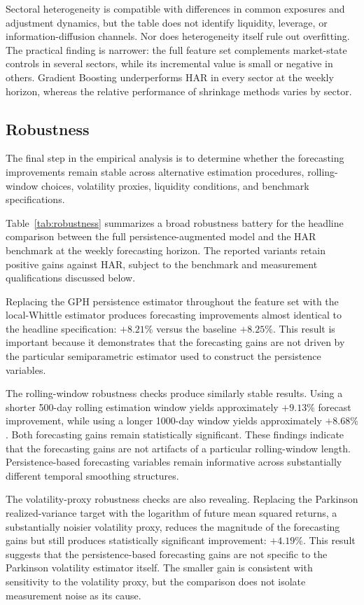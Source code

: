 \documentclass[jrfm,article,submit,moreauthors,pdftex]{Definitions/mdpi}
\begin{document}
Sectoral heterogeneity is compatible with differences in common exposures
and adjustment dynamics, but the table does not identify liquidity,
leverage, or information-diffusion channels. Nor does heterogeneity itself
rule out overfitting. The practical finding is narrower: the full feature
set complements market-state controls in several sectors, while its
incremental value is small or negative in others. Gradient Boosting
underperforms HAR in every sector at the weekly horizon, whereas the
relative performance of shrinkage methods varies by sector.

\subsection{Robustness}

The final step in the empirical analysis is to determine whether the
forecasting improvements remain stable across alternative estimation
procedures, rolling-window choices, volatility proxies, liquidity
conditions, and benchmark specifications.

Table~\ref{tab:robustness} summarizes a broad robustness battery for the
headline comparison between the full persistence-augmented model and the HAR benchmark
at the weekly forecasting horizon. The reported variants retain positive gains against HAR, subject to the
benchmark and measurement qualifications discussed below.

Replacing the GPH persistence estimator throughout the feature set with
the local-Whittle estimator produces forecasting improvements almost
identical to the headline specification: $+8.21\%$ versus the baseline
$+8.25\%$. This result is important because it demonstrates that the
forecasting gains are not driven by the particular semiparametric estimator
used to construct the persistence variables.

The rolling-window robustness checks produce similarly stable results.
Using a shorter 500-day rolling estimation window yields approximately
$+9.13\%$ forecast improvement, while using a longer 1000-day window
yields approximately $+8.68\%$. Both forecasting gains remain statistically
significant. These findings indicate that the forecasting gains are not
artifacts of a particular rolling-window length. Persistence-based
forecasting variables remain informative across substantially different
temporal smoothing structures.

The volatility-proxy robustness checks are also revealing. Replacing the
Parkinson realized-variance target with the logarithm of future mean
squared returns, a substantially noisier volatility proxy, reduces
the magnitude of the forecasting gains but still produces statistically
significant improvement: $+4.19\%$. This result suggests that the
persistence-based forecasting gains are not specific to the Parkinson
volatility estimator itself. The smaller gain is consistent with
sensitivity to the volatility proxy, but the comparison does not isolate
measurement noise as its cause.
\end{document}

